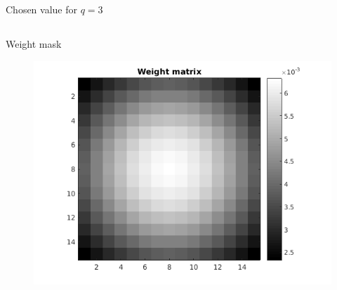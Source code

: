 \documentclass[11pt]{article}
\begin{document}
\maketitle

\subsection{}
Chosen value for $q = 3$

\subsection{}
Weight mask 
\FloatBarrier
\begin{figure}[h]
\centering
\includegraphics[scale=0.5]{weight}
\end{figure}
\end{document}

